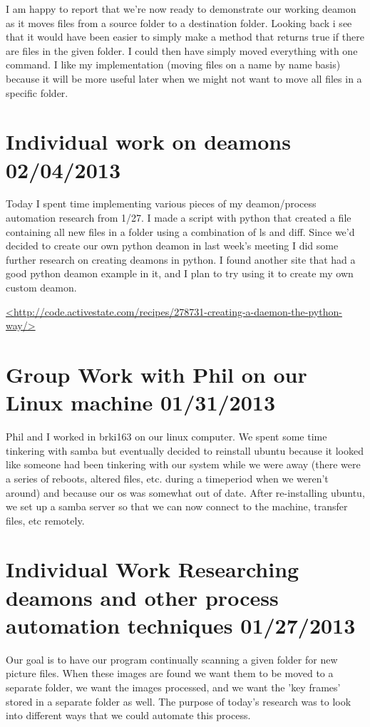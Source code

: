 \documentclass[]{article}
\begin{document}
	I am happy to report that we're now ready to demonstrate our working deamon as it moves files from a source folder to a destination folder.
	Looking back i see that it would have been easier to simply make a method that returns true if there are files in the given folder. I could then have simply moved everything with one command. I like my implementation (moving files on a name by name basis) because it will be more useful later when we might not want to move all files in a specific folder.	
	
	
	\section{Individual work on deamons 02/04/2013}
	
	Today I spent time implementing various pieces of my deamon/process automation research from 1/27.
	I made a script with python that created a file containing all new files in a folder using a combination of ls and diff.
	Since we'd decided to create our own python deamon in last week's meeting I did some further research on creating deamons in python. I found another site that had a good python deamon example in it, and I plan to try using it to create my own custom deamon.
	
	\url{<http://code.activestate.com/recipes/278731-creating-a-daemon-the-python-way/>}
	
	\section{Group Work with Phil on our Linux machine 01/31/2013}
	
	Phil and I worked in brki163 on our linux computer. We spent some time tinkering with samba but eventually decided to reinstall ubuntu because it looked like someone had been tinkering with our system while we were away (there were a series of reboots, altered files, etc. during a timeperiod when we weren't around) and because our os was somewhat out of date. After re-installing ubuntu, we set up a samba server so that we can now connect to the machine, transfer files, etc remotely.
	
	\section{Individual Work Researching deamons and other process automation techniques 01/27/2013}	
	
	Our goal is to have our program continually scanning a given folder for new picture files. When these images are found we want them to be moved to a separate folder, we want the images processed, and we want the 'key frames' stored in a separate folder as well. The purpose of today's research was to look into different ways that we could automate this process.
	
\end{document}
